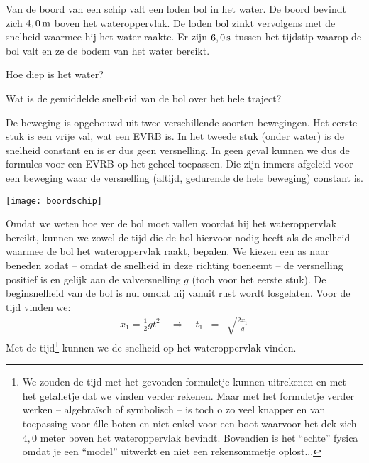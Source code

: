 \documentclass{ximera}
\begin{document}
	
	\begin{exercise}
	\begin{question} Van de boord van een schip valt een loden bol in het water. De \mbox{boord} bevindt zich $4,0\rm\,m$ boven het wateroppervlak. De loden bol zinkt vervolgens met de snelheid waarmee hij het water raakte. Er zijn $6,0\rm\,s$ tussen het tijdstip waarop de bol valt en ze de bodem van het water bereikt. \end{question}
	\begin{question} Hoe diep is het water? \end{question}
	\begin{question} Wat is de gemiddelde snelheid van de bol over het hele traject? \end{question}
	
	\begin{oplossing}
	De beweging is opgebouwd uit twee verschillende soorten bewegingen. Het eerste stuk is een vrije val, wat een EVRB is. In het tweede stuk (onder water) is de snelheid constant en is er dus geen versnelling. In geen geval kunnen we dus de formules voor een EVRB op het geheel toepassen. Die zijn immers afgeleid voor een beweging waar de versnelling (altijd, gedurende de hele beweging) constant is. \\
	\begin{image}
	\texttt{[image: boordschip]}
	\end{image}
	Omdat we weten hoe ver de bol moet vallen voordat hij het wateroppervlak bereikt, kunnen we zowel de tijd die de bol hiervoor nodig heeft als de snelheid waarmee de bol het wateroppervlak raakt, bepalen. We kiezen een as naar beneden zodat -- omdat de snelheid in deze richting toeneemt -- de versnelling positief is en gelijk aan de valversnelling $g$ (toch voor het eerste stuk). De beginsnelheid van de bol is nul omdat hij vanuit rust wordt losgelaten. Voor de tijd vinden we:
	\begin{eqnarray}
	x_1=\frac{1}{2}gt^2\quad\Rightarrow\quad t_1&=&\sqrt{\frac{2x_1}{g}}
	\end{eqnarray}
	Met de tijd\footnote{We zouden de tijd met het gevonden formuletje kunnen uitrekenen en met het getalletje dat we vinden verder rekenen. Maar met het formuletje verder werken -- algebra\"isch of symbolisch -- is toch o zo veel knapper en van toepassing voor \'alle boten en niet enkel voor een boot waarvoor het dek zich $4,0$ meter boven het wateroppervlak bevindt. Bovendien is het ``echte'' fysica omdat je een ``model'' uitwerkt en niet een rekensommetje oplost...} kunnen we de snelheid op het wateroppervlak vinden.

\end{oplossing}
\end{exercise}
\end{document}
